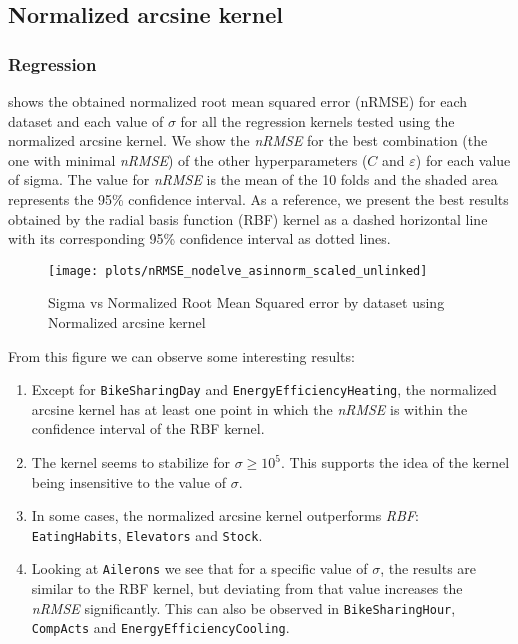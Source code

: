 
\subsection{Normalized arcsine kernel}

\subsubsection{Regression}

 shows the obtained normalized root mean
squared error (nRMSE) for each dataset and each value of $\sigma$ for all the
regression kernels tested using the normalized arcsine kernel. We show the
\emph{nRMSE} for the best combination (the one with minimal \emph{nRMSE})
of the other hyperparameters ($C$ and $\varepsilon$) for each value of sigma.
The value for \emph{nRMSE} is the mean of the 10 folds and the shaded area
represents the 95\% confidence interval.
As a reference, we present the best results obtained by the radial basis
function (RBF) kernel as a dashed horizontal line with its corresponding
95\% confidence interval as dotted lines.

\begin{figure}[H]
    \texttt{[image: plots/nRMSE\_nodelve\_asinnorm\_scaled\_unlinked]}
    \caption{Sigma vs Normalized Root Mean Squared error by dataset using Normalized arcsine kernel}%
    \label{fig:nrmse-asinnorm-scaled}
\end{figure}

From this figure we can observe some interesting results:

\begin{enumerate}
    \item Except for \texttt{BikeSharingDay} and \texttt{EnergyEfficiencyHeating},
          the normalized arcsine kernel has at least one point in which the \emph{nRMSE} is
          within the confidence interval of the RBF kernel.
    \item The kernel seems to stabilize for $\sigma \geq 10^5$. This supports
          the idea of the kernel being insensitive to the value of $\sigma$.
    \item In some cases, the normalized arcsine kernel outperforms \emph{RBF}:
          \texttt{EatingHabits}, \texttt{Elevators} and \texttt{Stock}.
    \item Looking at \texttt{Ailerons} we see that for a specific value of
          $\sigma$, the results are similar to the RBF kernel, but deviating
          from that value increases the \emph{nRMSE} significantly. This can also
          be observed in \texttt{BikeSharingHour}, \texttt{CompActs} and \texttt{EnergyEfficiencyCooling}.
\end{enumerate}

